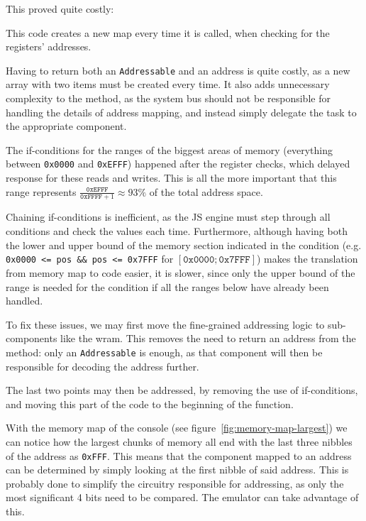 \documentclass[11pt]{informatics-report}
\begin{document}
This proved quite costly:
\begin{compactitem}
    \item This code creates a new map every time it is called, when checking for the registers' addresses.
    \item Having to return both an \texttt{Addressable} and an address is quite costly, as a new array with two items must be created every time. It also adds unnecessary complexity to the method, as the system bus should not be responsible for handling the details of address mapping, and instead simply delegate the task to the appropriate component.
    \item The if-conditions for the ranges of the biggest areas of memory (everything between \texttt{0x0000} and \texttt{0xEFFF}) happened after the register checks, which delayed response for these reads and writes. This is all the more important that this range represents $\frac{\texttt{0xEFFF}}{\texttt{0xFFFF}+1} \approx 93\%$ of the total address space.
    \item Chaining if-conditions is inefficient, as the JS engine must step through all conditions and check the values each time. Furthermore, although having both the lower and upper bound of the memory section indicated in the condition (e.g. \texttt{0x0000 <= pos \&\& pos <= 0x7FFF} for $[\texttt{0x0000}; \texttt{0x7FFF}]$) makes the translation from memory map to code easier, it is slower, since only the upper bound of the range is needed for the condition if all the ranges below have already been handled.
\end{compactitem}

To fix these issues, we may first move the fine-grained addressing logic to sub-components like the \gls{wram}. This removes the need to return an address from the method: only an \texttt{Addressable} is enough, as that component will then be responsible for decoding the address further.

The last two points may then be addressed, by removing the use of if-conditions, and moving this part of the code to the beginning of the function.

With the memory map of the console (see figure~\ref{fig:memory-map-largest}) we can notice how the largest chunks of memory all end with the last three nibbles of the address as \texttt{0xFFF}. This means that the component mapped to an address can be determined by simply looking at the first nibble of said address. This is probably done to simplify the circuitry responsible for addressing, as only the most significant 4 bits need to be compared. The emulator can take advantage of this.
\end{document}
